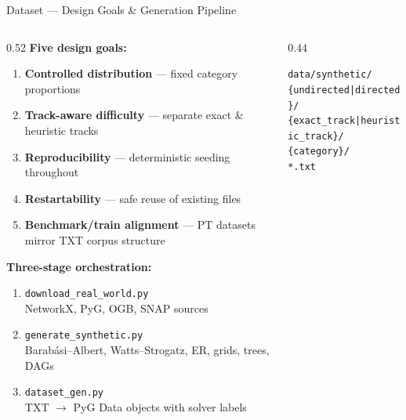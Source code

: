\documentclass[aspectratio=169,10pt]{beamer}
\newcommand{\highlight}[1]{\textcolor{midblue}{\textbf{#1}}}
\renewcommand{\footnotesize}{\tiny}
\begin{document}
\begin{frame}{Dataset — Design Goals \& Generation Pipeline}
  \begin{columns}[T]
    \begin{column}{0.52\textwidth}
      \textbf{Five design goals:}
      \begin{enumerate}\setlength\itemsep{2pt}
        \item \highlight{Controlled distribution} — fixed category proportions
        \item \highlight{Track-aware difficulty} — separate exact \& heuristic tracks
        \item \highlight{Reproducibility} — deterministic seeding throughout
        \item \highlight{Restartability} — safe reuse of existing files
        \item \highlight{Benchmark/train alignment} — PT datasets mirror
          TXT corpus structure
      \end{enumerate}
      \vspace{6pt}
      \textbf{Three-stage orchestration:}
      \begin{enumerate}
        \item \texttt{download\_real\_world.py}\\
          {\footnotesize NetworkX, PyG, OGB, SNAP sources}
        \item \texttt{generate\_synthetic.py}\\
          {\footnotesize Barabási–Albert, Watts–Strogatz, ER, grids, trees, DAGs}
        \item \texttt{dataset\_gen.py}\\
          {\footnotesize TXT $\to$ PyG Data objects with solver labels}
      \end{enumerate}
    \end{column}
    \begin{column}{0.44\textwidth}
      \begin{tcolorbox}[mybox,title=Directory Contract]
        \footnotesize
        \texttt{data/synthetic/}\\
        \quad\texttt{\{undirected|directed\}/}\\
        \quad\quad\texttt{\{exact\_track|heuristic\_track\}/}\\
        \quad\quad\quad\texttt{\{category\}/}\\
        \quad\quad\quad\quad\texttt{*.txt}
      \end{tcolorbox}
      \vspace{6pt}

\end{column}
\end{columns}
\end{frame}
\end{document}
